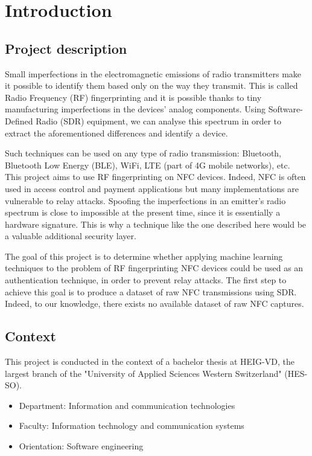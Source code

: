 \section{Introduction}

\subsection{Project description}

Small imperfections in the electromagnetic emissions of radio transmitters make it possible to identify them based only on the way they transmit. This is called Radio Frequency (RF) fingerprinting and it is possible thanks to tiny manufacturing imperfections in the devices' analog components. Using Software-Defined Radio (SDR) equipment, we can analyse this spectrum in order to extract the aforementioned differences and identify a device.

Such techniques can be used on any type of radio transmission: Bluetooth, Bluetooth Low Energy (BLE), WiFi, LTE (part of 4G mobile networks), etc. This project aims to use RF fingerprinting on NFC devices. Indeed, NFC is often used in access control and payment applications but many implementations are vulnerable to relay attacks. Spoofing the imperfections in an emitter's radio spectrum is close to impossible at the present time, since it is essentially a hardware signature. This is why a technique like the one described here would be a valuable additional security layer.

The goal of this project is to determine whether applying machine learning techniques to the problem of RF fingerprinting NFC devices could be used as an authentication technique, in order to prevent relay attacks. The first step to achieve this goal is to produce a dataset of raw NFC transmissions using SDR. Indeed, to our knowledge, there exists no available dataset of raw NFC captures.

\subsection{Context}

This project is conducted in the context of a bachelor thesis at HEIG-VD, the largest branch of the "University of Applied Sciences Western Switzerland" (HES-SO).

\begin{itemize}
  \item Department: Information and communication technologies
  \item Faculty: Information technology and communication systems
  \item Orientation: Software engineering
\end{itemize}

